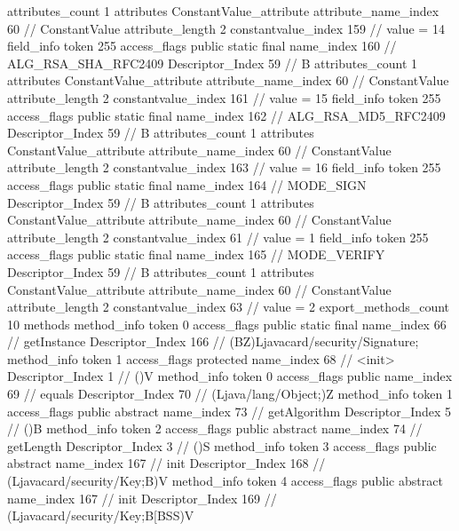 {{{{{				attributes_count	1
				attributes {
				ConstantValue_attribute {
					attribute_name_index	60		// ConstantValue
					attribute_length	2
					constantvalue_index	159		// value = 14
				}
				}
			}
			field_info {
				token	255
				access_flags	public static final
				name_index	160		// ALG_RSA_SHA_RFC2409
				Descriptor_Index	59		// B
				attributes_count	1
				attributes {
				ConstantValue_attribute {
					attribute_name_index	60		// ConstantValue
					attribute_length	2
					constantvalue_index	161		// value = 15
				}
				}
			}
			field_info {
				token	255
				access_flags	public static final
				name_index	162		// ALG_RSA_MD5_RFC2409
				Descriptor_Index	59		// B
				attributes_count	1
				attributes {
				ConstantValue_attribute {
					attribute_name_index	60		// ConstantValue
					attribute_length	2
					constantvalue_index	163		// value = 16
				}
				}
			}
			field_info {
				token	255
				access_flags	public static final
				name_index	164		// MODE_SIGN
				Descriptor_Index	59		// B
				attributes_count	1
				attributes {
				ConstantValue_attribute {
					attribute_name_index	60		// ConstantValue
					attribute_length	2
					constantvalue_index	61		// value = 1
				}
				}
			}
			field_info {
				token	255
				access_flags	public static final
				name_index	165		// MODE_VERIFY
				Descriptor_Index	59		// B
				attributes_count	1
				attributes {
				ConstantValue_attribute {
					attribute_name_index	60		// ConstantValue
					attribute_length	2
					constantvalue_index	63		// value = 2
				}
				}
			}
			}
			export_methods_count	10
			methods {
				method_info {
					token	0
					access_flags	public static final
					name_index	66		// getInstance
					Descriptor_Index	166		// (BZ)Ljavacard/security/Signature;
				}
				method_info {
					token	1
					access_flags	protected
					name_index	68		// <init>
					Descriptor_Index	1		// ()V
				}
				method_info {
					token	0
					access_flags	public
					name_index	69		// equals
					Descriptor_Index	70		// (Ljava/lang/Object;)Z
				}
				method_info {
					token	1
					access_flags	public abstract
					name_index	73		// getAlgorithm
					Descriptor_Index	5		// ()B
				}
				method_info {
					token	2
					access_flags	public abstract
					name_index	74		// getLength
					Descriptor_Index	3		// ()S
				}
				method_info {
					token	3
					access_flags	public abstract
					name_index	167		// init
					Descriptor_Index	168		// (Ljavacard/security/Key;B)V
				}
				method_info {
					token	4
					access_flags	public abstract
					name_index	167		// init
					Descriptor_Index	169		// (Ljavacard/security/Key;B[BSS)V
}}}}}
